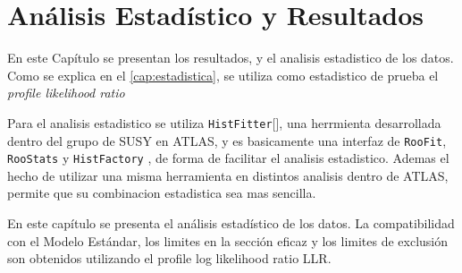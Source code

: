 \chapter{Análisis Estadístico y Resultados}

En este Capítulo se presentan los resultados, y el analisis estadistico
de los datos. Como se explica en el \cref{cap:estadistica}, se utiliza
como estadistico de prueba el \emph{profile likelihood ratio}



Para el analisis estadistico se utiliza \texttt{HistFitter}[], una herrmienta
desarrollada dentro del grupo de SUSY en ATLAS, y es basicamente una interfaz
de \texttt{RooFit}, \texttt{RooStats}\cite{Moneta:2010pm} y
\texttt{HistFactory} \cite{Cranmer:1456844}, de forma de facilitar el analisis
estadistico. Ademas el hecho de utilizar una misma herramienta en distintos
analisis dentro de ATLAS, permite que su combinacion estadistica sea mas sencilla.


En este capítulo se presenta el análisis estadístico de los datos. La
compatibilidad con el Modelo Estándar, los limites en la sección eficaz y los
limites de exclusión son obtenidos utilizando el profile log likelihood ratio
LLR.








